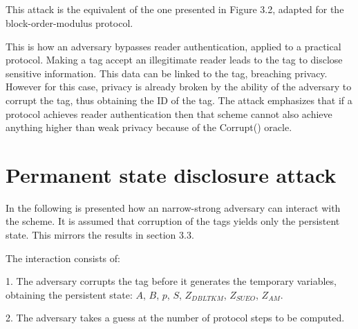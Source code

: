\begin{adjustwidth}{-30pt}{}
{    %
    \<\< \< \\[-3ex]
    \< \< \< \<  \\[-1ex]
    \< \< \< \<  \\[-1ex]
    \< \< \< \<  \\[-1ex]
    }
    \end{adjustwidth}

    This attack is the equivalent of the one presented in Figure 3.2, adapted for the block-order-modulus protocol. 

    This is how an adversary bypasses reader authentication, applied to a practical protocol. Making a tag
    accept an illegitimate reader leads to the tag to disclose sensitive information. This data can be linked to the tag, breaching privacy.
    However for this case, privacy is already broken by the ability of the adversary to corrupt the tag, thus obtaining the ID of the tag.
    The attack emphasizes that if a protocol achieves reader authentication then that scheme cannot also achieve anything higher than weak
    privacy because of the Corrupt() oracle.

\section{Permanent state disclosure attack}

    In the following is presented how an narrow-strong adversary can interact with the scheme. It is assumed that 
    corruption of the tags yields only the persistent state. This mirrors the results in section 3.3.
    
    The interaction consists of:

    1. The adversary corrupts the tag before it generates the temporary variables, obtaining the persistent state: 
    $A$, $B$, $p$, $S$, $Z_{DBLTKM}$, $Z_{SUEO}$, $Z_{AM}$.

    2. The adversary takes a guess at the number of protocol steps to be computed.

